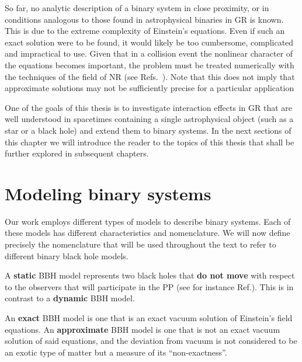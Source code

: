 So far, no analytic description of a binary system in close proximity, or in conditions analogous to those found in astrophysical binaries in \ac{GR} is known. This is due to the extreme complexity of Einstein's equations. Even if such an exact solution were to be found, it would likely be too cumbersome, complicated and impractical to use. Given that in a collision event the nonlinear character of the equations becomes important, the problem must be treated numerically with the techniques of the field of \ac{NR} (see Refs.~\cite{Alcubierre2012-xp, 9780521514071, 9781108928250}). Note that this does not imply that approximate solutions may not be sufficiently precise for a particular application

One of the goals of this thesis is to investigate interaction effects in \ac{GR} that are well understood in spacetimes containing a single astrophysical object (such as a star or a black hole) and extend them to binary systems. In the next sections of this chapter we will introduce the reader to the topics of this thesis that shall be further explored in subsequent chapters.

\section{Modeling binary systems}
\label{sec:intro_modeling_binaries}

Our work employs different types of models to describe binary systems. Each of these models has different characteristics and nomenclature.  We will now define precisely the nomenclature that will be used throughout the text to refer to different binary black hole models.

\begin{definition}
  A \textbf{static} \ac{BBH} model represents two black holes that \textbf{do not move} with respect to the observers that will participate in the \ac{PP} (see for instance Ref.\cite{dias2023static}). This is in contrast to a \textbf{dynamic} \ac{BBH} model.
\end{definition}

\begin{definition}
  An \textbf{exact} \ac{BBH} model is one that is an exact vacuum solution of Einstein's field equations. An \textbf{approximate} \ac{BBH} model is one that is not an exact vacuum solution of said equations, and the deviation from vacuum is not considered to be an exotic type of matter but a measure of its ``non-exactness''.
\end{definition}


